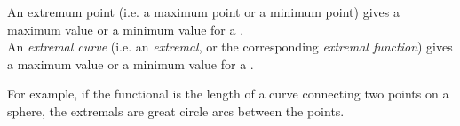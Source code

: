 \documentclass[12pt]{article}
\theoremstyle{definition}
\begin{document}

An extremum point (i.e. a maximum point or a minimum point) gives a maximum value or a minimum value for a .\\

An \emph{extremal curve} (i.e. an \emph{extremal}, or the corresponding \emph{extremal function}) gives a maximum value or a minimum value for a .

For example, if the functional is the length of a curve connecting two points on a sphere, the extremals are great circle arcs between the points.
\end{document}
